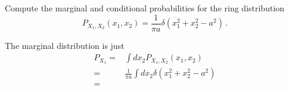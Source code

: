 

Compute the marginal and conditional probabilities for the ring distribution
\begin{equation*}
P_{X_1, X_2}(x_1, x_2) = \frac{1}{\pi a} \delta (x_1^2 + x_2^2 - a^2) \, .
\end{equation*}


The marginal distribution is just
\begin{align*}
P_{X_1}
=& \int d x_2 P_{X_1, X_2}(x_1, x_2) \\
=& \frac{1}{\pi a} \int d x_2 \delta(x_1^2 + x_2^2 - a^2) \\
=& 
\end{align*}
